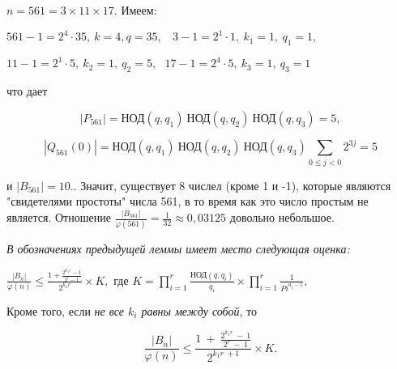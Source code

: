	$n = 561 = 3 \times 11 \times 17$. Имеем:
	
	\begin{center}
		
		$561 - 1 = 2^4 \cdot 35,~k = 4, q = 35,~~~~ 3 - 1 = 2^1 \cdot 1,~k_1 = 1,~q_1 = 1,$
		
		$11 - 1 = 2^1 \cdot 5,~k_2 = 1,~q_2 = 5,~~~ 17 - 1 = 2^4 \cdot 5,~k_3 = 1,~q_3 = 1$
		
	\end{center}
	
	что дает
	
	$$|P_{561}| = \text{НОД}(q, q_1)~\text{НОД}(q, q_2)~\text{НОД}(q, q_3) = 5,$$
	
	$$|Q_{561}(0)| = \text{НОД}(q, q_1)~\text{НОД}(q, q_2)~\text{НОД}(q, q_3) \sum_{0 \leqslant j < 0} 2^{3j} = 5$$
	
	\noindent и $|B_{561}| = 10.$. Значит, существует 8 числел (кроме 1 и -1), которые являются "свидетелями простоты" числа 561, в то время как это число простым не является. Отношение $\frac{|B_{561}|}{\varphi(561)} = \frac{1}{32} \approx 0, 03125$ довольно небольшое.
	
	\begin{lemma}
		
		\hspace*{0,5cm}
		
		\textit{В обозначениях предыдущей леммы имеет место следующая оценка:}
		
		\begin{center}
			
			$\frac{|B_n|}{\varphi(n)} \leqslant \frac{1 + \frac{2^{k_1r} -1}{2^{r} - 1}}{2^{k_1r}} \times K,$ где $ K = \prod_{i=1}^{r} \frac{\text{НОД}(q, q_i)}{q_i} \times \prod_{i=1}^{r} \frac{1}{Pi^{a_i-1}},$
			
		\end{center}
		
		Кроме того, если \textit{не все $k_i$ равны между собой}, то
		
		$$\frac{|B_n|}{\varphi(n)} \leqslant \frac{1~+~\frac{2^{k_1r}~-~1}{2^{r}~-~1}}{2^{k_1r~+1}} \times K.$$
		
	\end{lemma}
	
